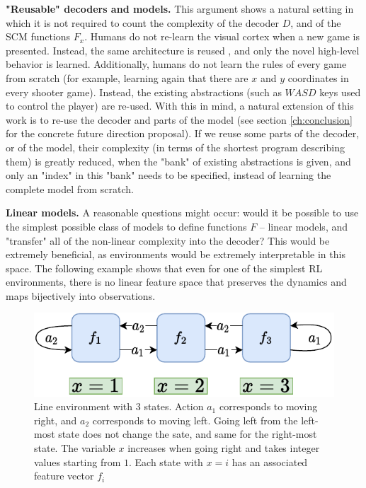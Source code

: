 \documentclass[a4paper,11pt,oneside]{report}
\begin{document}
{\bf "Reusable" decoders and models.} This argument shows a natural setting in which it is not required to count the complexity of the decoder $D$, and of the SCM functions $F_x$. Humans do not re-learn the visual cortex when a new game is presented. Instead, the same architecture is reused \cite{Bengio2012,Veerapaneni2019,Ibrahim2020,Didolkar2021,Gomez2006,Mao2019}, and only the novel high-level behavior is learned. Additionally, humans do not learn the rules of every game from scratch (for example, learning again that there are $x$ and $y$ coordinates in every shooter game). Instead, the existing abstractions (such as $WASD$ keys used to control the player) are re-used. With this in mind, a natural extension of this work is to re-use the decoder and parts of the model (see section \ref{ch:conclusion} for the concrete future direction proposal). If we reuse some parts of the decoder, or of the model, their complexity (in terms of the shortest program describing them) is greatly reduced, when the "bank" of existing abstractions is given, and only an "index" in this "bank" needs to be specified, instead of learning the complete model from scratch.


{\bf Linear models.} A reasonable questions might occur: would it be possible to use the simplest possible class of models to define functions $F$ -- linear models, and "transfer" all of the non-linear complexity into the decoder? This would be extremely beneficial, as environments would be extremely interpretable in this space. The following example shows that even for one of the simplest RL environments, there is no linear feature space that preserves the dynamics and maps bijectively into observations.

\begin{figure}
    \centering
    \includegraphics[width=0.7\linewidth]{diagrams/env_line_3}
    \caption{Line environment with 3 states. Action $a_1$ corresponds to moving right, and $a_2$ corresponds to moving left. Going left from the left-most state does not change the sate, and same for the right-most state. The variable $x$ increases when going right and takes integer values starting from $1$. Each state with $x=i$ has an associated feature vector $f_i$}
    \label{fig:env_line3}
\end{figure}
\end{document}

